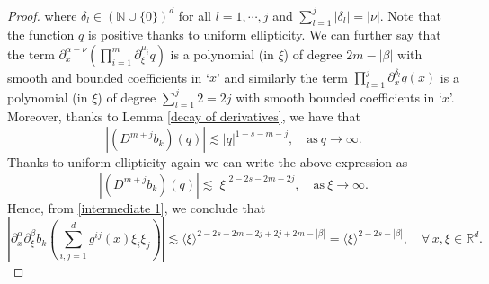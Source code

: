 \documentclass[10pt,a4paper]{amsart}
\begin{document}
\begin{proof}
		where $\delta_l\in (\mathbb{N}\cup\{0\})^d$ for all $l=1,\cdots,j$ and $\displaystyle{\sum_{l=1}^j |\delta_l|=|\nu|}$. Note that the function $q$ is positive thanks to uniform ellipticity. We can further say that the term $\displaystyle{\partial^{\alpha-\nu}_{x}\left(\prod_{i=1}^m \partial_{\xi}^{\mu_i} q\right)}$ is a polynomial (in $\xi$) of degree $2m-|\beta|$ with smooth and bounded coefficients in `$x$' and similarly the term $\displaystyle{\prod_{l=1}^{j} \partial_x^{\delta_l} q(x)}$ is a polynomial (in $\xi$) of degree $\displaystyle{\sum_{l=1}^j 2=2j}$ with smooth bounded coefficients in `$x$'. Moreover, thanks to Lemma \ref{decay of derivatives}, we have that 
		\[
		\left| (D^{m+j} b_k)(q)\right| \lesssim | q|^{1-s-m-j}, \quad \mbox{as} \ q\to \infty. 
		\]
		Thanks to uniform ellipticity again we can write the above expression as 
		\[
		\left| (D^{m+j} b_k)(q)\right| \lesssim | \xi|^{2-2s-2m-2j}, \quad \mbox{as} \ \xi\to \infty.
		\]
		Hence, from \eqref{intermediate 1}, we conclude that
		\[
		\left|\partial_x^{\alpha}\partial_{\xi}^{\beta} b_k\left(\sum_{i,j=1}^d g^{ij}(x)\xi_i\xi_j\right)\right|
		\lesssim
		\langle \xi\rangle^{2-2s-2m-2j+2j+2m-|\beta|}=  \langle \xi\rangle^{2-2s-|\beta|}, \quad \forall\, x, \xi\in\mathbb{R}^d.
		\]
	\end{proof}
\end{document}
